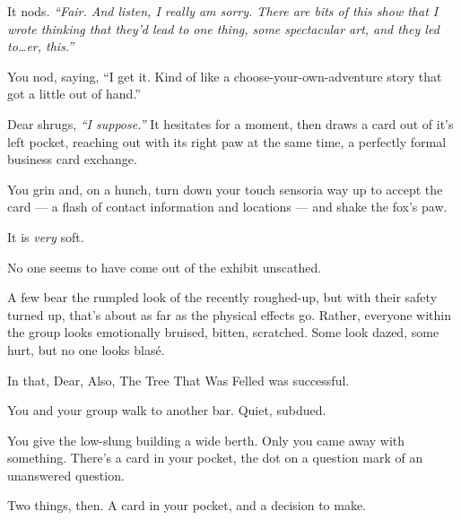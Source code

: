 It nods. \emph{``Fair. And listen, I really am sorry. There are bits of this show that I wrote thinking that they'd lead to one thing, some spectacular art, and they led to\ldots{}er, this.''}

You nod, saying, ``I get it. Kind of like a choose-your-own-adventure story that got a little out of hand.''

Dear shrugs, \emph{``I suppose.''} It hesitates for a moment, then draws a card out of it's left pocket, reaching out with its right paw at the same time, a perfectly formal business card exchange.

You grin and, on a hunch, turn down your touch sensoria way up to accept the card --- a flash of contact information and locations --- and shake the fox's paw.

It is \emph{very} soft.


\newpage

\null
\vfill

No one seems to have come out of the exhibit unscathed.

A few bear the rumpled look of the recently roughed-up, but with their safety turned up, that's about as far as the physical effects go. Rather, everyone within the group looks emotionally bruised, bitten, scratched. Some look dazed, some hurt, but no one looks blasé.

In that, Dear, Also, The Tree That Was Felled was successful.

You and your group walk to another bar. Quiet, subdued.

You give the low-slung building a wide berth. Only you came away with something. There's a card in your pocket, the dot on a question mark of an unanswered question.

Two things, then. A card in your pocket, and a decision to make.

\vfill
